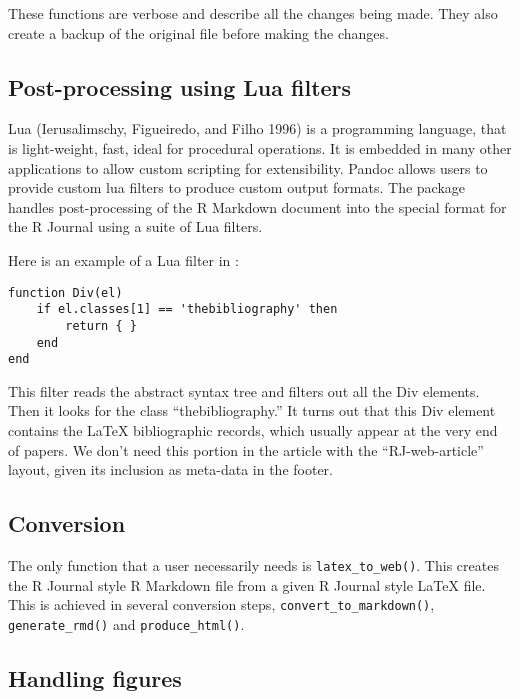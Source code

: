 These functions are verbose and describe all the changes being made. They also create a backup of the original file before making the changes.

\hypertarget{post-processing-using-lua-filters}{%
\subsection{Post-processing using Lua filters}\label{post-processing-using-lua-filters}}

Lua (Ierusalimschy, Figueiredo, and Filho 1996) is a programming language, that is light-weight, fast, ideal for procedural operations. It is embedded in many other applications to allow custom scripting for extensibility. Pandoc allows users to provide custom lua filters to produce custom output formats. The  package handles post-processing of the R Markdown document into the special format for the R Journal using a suite of Lua filters.

Here is an example of a Lua filter in :

\begin{verbatim}
function Div(el)
    if el.classes[1] == 'thebibliography' then
        return { }
    end
end
\end{verbatim}

This filter reads the abstract syntax tree and filters out all the Div elements. Then it looks for the class ``thebibliography.'' It turns out that this Div element contains the LaTeX bibliographic records, which usually appear at the very end of papers. We don't need this portion in the article with the ``RJ-web-article'' layout, given its inclusion as meta-data in the footer.

\hypertarget{conversion}{%
\subsection{Conversion}\label{conversion}}

The only function that a user necessarily needs is \texttt{latex\_to\_web()}. This creates the R Journal style R Markdown file from a given R Journal style LaTeX file.
This is achieved in several conversion steps, \texttt{convert\_to\_markdown()}, \texttt{generate\_rmd()} and \texttt{produce\_html()}.

\hypertarget{handling-figures}{%
\subsection{Handling figures}\label{handling-figures}}

